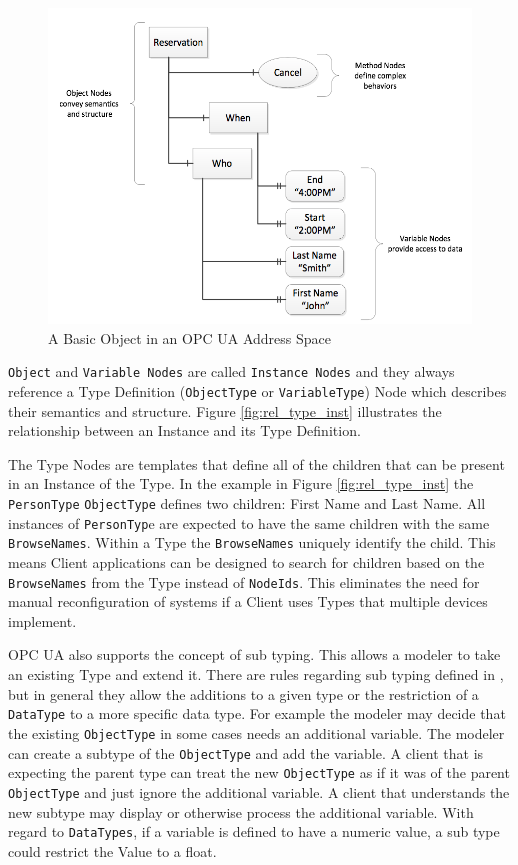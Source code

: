 \begin{figure}[h]
  \centering
  \includegraphics[width=1.0\textwidth]{diagrams/OpcUaBasicObject.png}
  \caption{A Basic Object in an OPC UA Address Space}
  \label{fig:opcua_basic_object}
\end{figure}

\texttt{Object} and \texttt{Variable Nodes} are called \texttt{Instance Nodes} and they always reference a Type Definition (\texttt{ObjectType} or \texttt{VariableType}) Node which describes their semantics and structure. Figure \ref{fig:rel_type_inst} illustrates the relationship between an Instance and its Type Definition.

The Type Nodes are templates that define all of the children that can be present in an Instance of the Type. In the example in Figure \ref{fig:rel_type_inst} the \texttt{PersonType} \texttt{ObjectType} defines two children: First Name and Last Name. All instances of \texttt{PersonTyp}e are expected to have the same children with the same \texttt{BrowseNames}. Within a Type the \texttt{BrowseNames} uniquely identify the child. This means Client applications can be designed to search for children based on the \texttt{BrowseNames} from the Type instead of \texttt{NodeIds}. This eliminates the need for manual reconfiguration of systems if a Client uses Types that multiple devices implement.

OPC UA also supports the concept of sub typing. This allows a modeler to take an existing Type and extend it. There are rules regarding sub typing defined in \cite{UAPart3}, but in general they allow the additions to a given type or the restriction of a \texttt{DataType} to a more specific data type. For example the modeler may decide that the existing \texttt{ObjectType} in some cases needs an additional variable. The modeler can create a subtype of the \texttt{ObjectType} and add the variable. A client that is expecting the parent type can treat the new \texttt{ObjectType} as if it was of the parent \texttt{ObjectType} and just ignore the additional variable. A client that understands the new subtype may display or otherwise process the additional variable. With regard to \texttt{DataTypes}, if a variable is defined to have a numeric value, a sub type could restrict the Value to a float.

